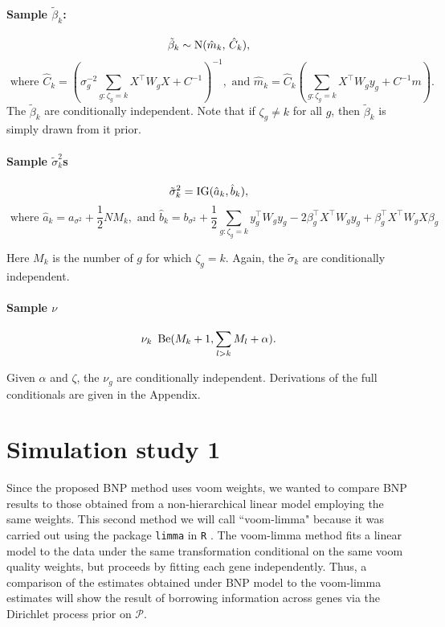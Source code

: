 \begin{itemize}
\paragraph{Sample $\tilde{\beta}_k$:}
\begin{equation*}
\tilde{\beta}_k \sim \operatorname{N}(\hat{m}_k,\, \hat{C}_k),
\end{equation*}
\begin{equation*}
\mbox{ where }\hat{C}_k= \left( \sigma^{-2}_g\sum_{g:\zeta_g=k}
  X^\top W_g X + C^{-1} \right)^{-1}, \mbox{ and }\hat{m}_k=\hat{C}_k \left(\sum_{g:\zeta_g=k} X^\top W_g y_g +
      C^{-1}m \right).
\end{equation*}
The $\tilde{\beta}_k$ are conditionally independent. Note that if $\zeta_g \neq k$ for all $g$, then $\tilde{\beta}_k$ is simply drawn from it prior.

\paragraph{Sample $\tilde{\sigma}_k^2$s}
\begin{equation*}
      \tilde{\sigma}_k^2 = \operatorname{IG}(\hat{a}_k,\hat{b}_k),
    \end{equation*}
    \begin{equation*}
      \mbox{ where }\hat{a}_k = a_{\sigma^2} + \frac{1}{2}NM_k,\mbox{ and }\hat{b}_k= b_{\sigma^2} + \frac{1}{2}\sum_{g:\zeta_g=k}y_g^\top W_g y_g -2 \beta_g^\top X^\top W_g y_g  +\beta_g^\top X^\top W_g X \beta_g
    \end{equation*}

    Here $M_k$ is the number of $g$ for which $\zeta_g = k$. Again, the $\tilde{\sigma}_k$ are conditionally independent.

\paragraph{Sample $\nu$}
\begin{equation*}
\nu_k ~ \operatorname{Be}(M_k + 1, \sum_{l>k}M_l + \alpha).
\end{equation*}

Given $\alpha$ and $\zeta$, the $\nu_g$ are conditionally independent. Derivations of the full conditionals are given in the Appendix.

\section{Simulation study 1}
\label{sec:ss1}
Since the proposed BNP method uses voom weights, we wanted to compare BNP results to those obtained from a non-hierarchical linear model employing the same weights. This second method we will call ``voom-limma" because it was carried out using the package \texttt{limma} in \texttt{R} \citep{smyth2005limma}. The voom-limma method fits a linear model to the data under the same transformation conditional on the same voom quality weights, but proceeds by fitting each gene independently. Thus, a comparison of the estimates obtained under BNP model to the voom-limma estimates will show the result of borrowing information across genes via the Dirichlet process prior on $\mathcal{P}$.


\end{itemize}

